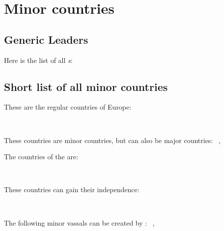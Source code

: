 
\chapter{Minor countries}




\section{Generic Leaders}

Here is the list of all \unskip\textit{s}:
\listanonymeneutre
\aparag[Mercenaries]
\listanonymemercenaires




\section{Short list of all minor countries}

\label{chapter:Minors:List}
These are the regular countries of Europe:
\begin{multicols}{4}
  {\theminorreligionshort{\loopitem}~\pays{\loopitem}\\}{}
\end{multicols}

These countries are minor countries, but can also be major countries:
%
{\theminorreligionshort{\loopitem}~\pays{\loopitem}}{, }

\aparag[\ROTW] The countries of the \ROTW are:
\begin{multicols}{4}
  {\theminorreligionshort{\loopitem}~\pays{\loopitem}\\}{}
\end{multicols}

 These countries can gain their
independence:
\begin{multicols}{5}
  {\theminorreligionshort{\loopitem}~\pays{\loopitem}\\}{}
\end{multicols}

 The following minor vassals can be
created by \HAB: %
{\theminorreligionshort{\loopitem}~\pays{\loopitem}}{, }

